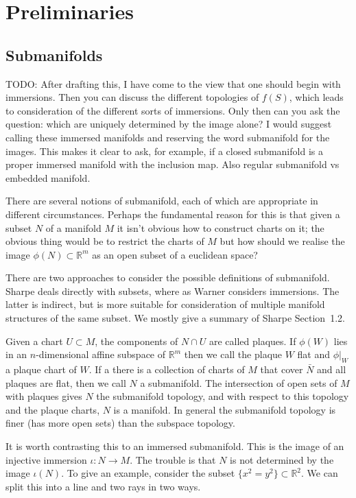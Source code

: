 \documentclass[twoside,11pt,a4paper,leqno]{article}
\numberwithin{equation}{section}
\theoremstyle{plain}
\theoremstyle{definition}
\newcommand{\bbR}{\mathbb{R}}
\begin{document}
\section{Preliminaries}

\subsection{Submanifolds}

TODO: After drafting this, I have come to the view that one should begin with immersions.
Then you can discuss the different topologies of $f(S)$, which leads to consideration of the different sorts of immersions.
Only then can you ask the question: which are uniquely determined by the image alone?
I would suggest calling these immersed manifolds and reserving the word submanifold for the images.
This makes it clear to ask, for example, if a closed submanifold is a proper immersed manifold with the inclusion map.
Also regular submanifold vs embedded manifold.

There are several notions of submanifold, each of which are appropriate in different circumstances.
Perhaps the fundamental reason for this is that given a subset $N$ of a manifold $M$ it isn't obvious how to construct charts on it; the obvious thing would be to restrict the charts of $M$ but how should we realise the image $\phi(N) \subset \bbR^m$ as an open subset of a euclidean space?

There are two approaches to consider the possible definitions of submanifold. Sharpe deals directly with subsets, where as Warner considers immersions.
The latter is indirect, but is more suitable for consideration of multiple manifold structures of the same subset.
We mostly give a summary of Sharpe Section~1.2.

Given a chart $U \subset M$, the components of $N\cap U$ are called plaques.
If $\phi(W)$ lies in an $n$-dimensional affine subspace of $\bbR^m$ then we call the plaque $W$ flat and $\phi|_W$ a plaque chart of $W$.
If a there is a collection of charts of $M$ that cover $\bar{N}$ and all plaques are flat, then we call $N$ a submanifold.
The intersection of open sets of $M$ with plaques gives $N$ the submanifold topology, and with respect to this topology and the plaque charts, $N$ is a manifold.
In general the submanifold topology is finer (has more open sets) than the subspace topology.

It is worth contrasting this to an immersed submanifold. This is the image of an injective immersion $\iota : N \to M$.
The trouble is that $N$ is not determined by the image $\iota(N)$.
To give an example, consider the subset $\{x^2 = y^2\} \subset \bbR^2$.
We can split this into a line and two rays in two ways.
\end{document}
